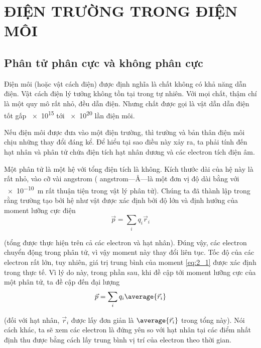 

\chapter{ĐIỆN TRƯỜNG TRONG ĐIỆN MÔI}\label{chap:2}

\section{Phân tử phân cực và không phân cực}\label{sec:2_1}

Điện môi (hoặc vật cách điện) được định nghĩa là chất không có khả năng dẫn điện. Vật cách điện lý tưởng không tồn tại trong tự nhiên. Với mọi chất, thậm chí là một quy mô rất nhỏ, đều dẫn điện. Nhưng chất được gọi là vật dẫn dẫn điện tốt gấp \num{e15} tới \num{e20} lần điện môi.

Nếu điện môi được đưa vào một điện trường, thì trường và bản thân điện môi chịu những thay đổi đáng kể. Để hiểu tại sao điều này xảy ra, ta phải tính đến hạt nhân và phân tử chứa điện tích hạt nhân dương và các electron tích điện âm.

Một phân tử là một hệ với tổng điện tích là không. Kích thước dài của hệ này là rất nhỏ, vào cỡ vài angstrom ( angstrom---\si{\angstrom}---là một đơn vị độ dài bằng với \SI{e-10}{\metre} rất thuận tiện trong vật lý phân tử). Chúng ta đã thành lập trong  rằng trường tạo bởi hệ như vật được xác định bởi độ lớn và định hướng của moment lưỡng cực điện
\begin{equation}\label{eq:2_1}
    \vec{p} = \sum_i q_i \vec{r}_i
\end{equation}

\noindent
(tổng được thực hiện trên cả các electron và hạt nhân). Đúng vậy, các electron chuyển động trong phân tử, vì vậy moment này thay đổi liên tục. Tốc độ của các electron rất lớn, tuy nhiên, giá trị trung bình của moment \eqref{eq:2_1} được xác định trong thực tế. Vì lý do này, trong phần sau, khi đề cập tới moment lưỡng cực của một phân tử, ta đề cập đến đại lượng
\begin{equation}\label{eq:2_2}
    \vec{p} = \sum_i q_i \average{\vec{r}_i}
\end{equation}

\noindent
(đối với hạt nhân, $\vec{r}_i$ được lấy đơn giản là $\average{\vec{r}_i}$ trong tổng này). Nói cách khác, ta sẽ xem các electron là đứng yên so với hạt nhân tại các điểm nhất định thu được bằng cách lấy trung bình vị trí của electron theo thời gian.

